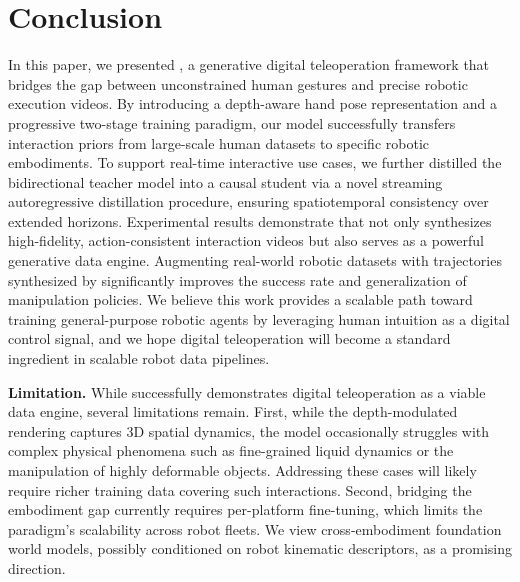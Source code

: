 \section{Conclusion}
In this paper, we presented \our, a generative digital teleoperation framework that bridges the gap between unconstrained human gestures and precise robotic execution videos. By introducing a depth-aware hand pose representation and a progressive two-stage training paradigm, our model successfully transfers interaction priors from large-scale human datasets to specific robotic embodiments. To support real-time interactive use cases, we further distilled the bidirectional teacher model into a causal student via a novel streaming autoregressive distillation procedure, ensuring spatiotemporal consistency over extended horizons. Experimental results demonstrate that \our not only synthesizes high-fidelity, action-consistent interaction videos but also serves as a powerful generative data engine. Augmenting real-world robotic datasets with trajectories synthesized by \our significantly improves the success rate and generalization of manipulation policies. We believe this work provides a scalable path toward training general-purpose robotic agents by leveraging human intuition as a digital control signal, and we hope digital teleoperation will become a standard ingredient in scalable robot data pipelines.

\noindent
\textbf{Limitation.} 
While \our successfully demonstrates digital teleoperation as a viable data engine, several limitations remain.
First, while the depth-modulated rendering captures 3D spatial dynamics, the model occasionally struggles with complex physical phenomena such as fine-grained liquid dynamics or the manipulation of highly deformable objects. 
Addressing these cases will likely require richer training data covering such interactions.
Second, bridging the embodiment gap currently requires per-platform fine-tuning, which limits the paradigm's scalability across robot fleets. We view cross-embodiment foundation world models, possibly conditioned on robot kinematic descriptors, as a promising direction.


